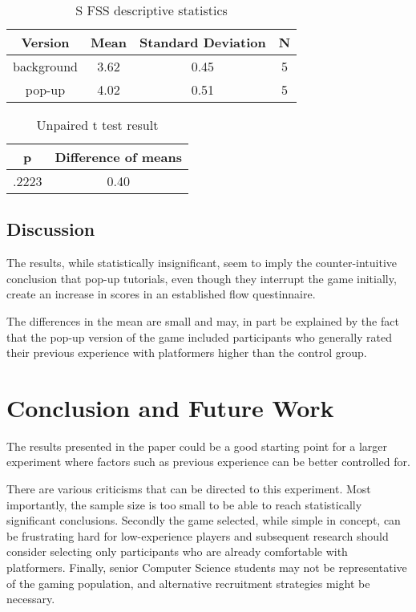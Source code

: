 \documentclass{acmsiggraph}
\begin{document}
\begin{table}[ht]
  \centering
  \caption{S FSS descriptive statistics}
  \label{SFSS descriptive}
  \begin{tabular}{|c|c|c|c|}
  	\hline
  	\textbf{Version} & \textbf{Mean} & \textbf{Standard Deviation} & \textbf{N}\\
    \hline
    background & 3.62 & 0.45 & 5 \\
	pop-up & 4.02 & 0.51 & 5 \\
    \hline
  \end{tabular}
\end{table}

\begin{table}[ht]
  \centering
  \caption{Unpaired t test result}
  \label{ttest}
  \begin{tabular}{|c|c|}
  	\hline
  	\textbf{p} & \textbf{Difference of means}\\
    \hline
    .2223 & 0.40 \\
    \hline
  \end{tabular}
\end{table}

\subsection{Discussion}
The results, while statistically insignificant, seem to imply the counter-intuitive conclusion that pop-up tutorials, even though they interrupt the game initially, create an increase in scores in an established flow questinnaire.

The differences in the mean are small and may, in part be explained by the fact that the pop-up version of the game included participants who generally rated their previous experience with platformers higher than the control group. 

\section{Conclusion and Future Work}
The results presented in the paper could be a good starting point for a larger experiment where factors such as previous experience can be better controlled for.

There are various criticisms that can be directed to this experiment. Most importantly, the sample size is too small to be able to reach statistically significant conclusions. Secondly the game selected, while simple in concept, can be frustrating hard for low-experience players and subsequent research should consider selecting only participants who are already comfortable with platformers. Finally, senior Computer Science students may not be representative of the gaming population, and alternative recruitment strategies might be necessary.
\end{document}
